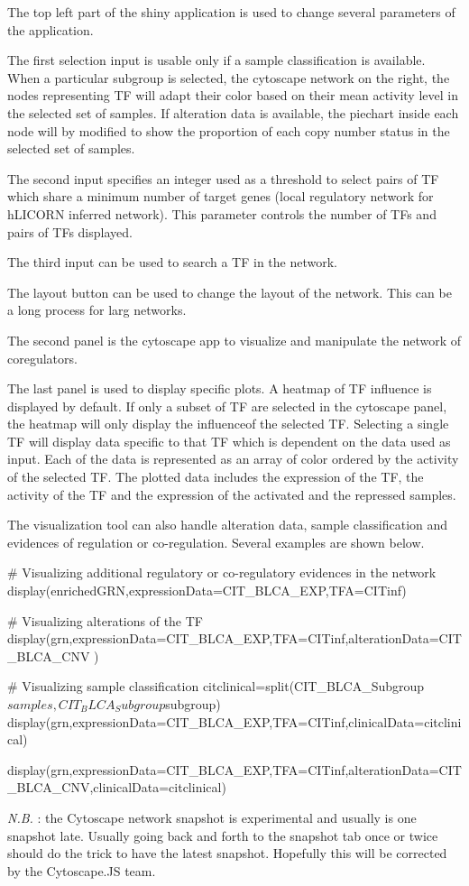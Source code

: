 \documentclass[12pt]{article}
\begin{document}
The top left part of the shiny application is used to change several
parameters of the application.


The first selection input is usable only if a sample classification is
available. When a particular subgroup is selected, the cytoscape network
on the right, the nodes representing TF will adapt their color based on
their mean activity level in the selected set of samples. If alteration
data is available, the piechart inside each node will by modified to
show the proportion of each copy number status in the selected set of
samples.

The second input specifies an integer used as a threshold to select
pairs of TF which share a minimum number of target genes (local
regulatory network for hLICORN inferred network). This parameter
controls the number of TFs and pairs of TFs displayed.

The third input can be used to search a TF in the network.

The layout button can be used to change the layout of the network. This
can be a long process for larg networks.

The second panel is the cytoscape app to visualize and manipulate the
network of coregulators.

The last panel is used to display specific plots. A heatmap of TF
influence is displayed by default. If only a subset of TF are selected
in the cytoscape panel, the heatmap will only display the influenceof
the selected TF. Selecting a single TF will display data specific to
that TF which is dependent on the data used as input. Each of the data
is represented as an array of color ordered by the activity of the
selected TF. The plotted data includes the expression of the TF, the
activity of the TF and the expression of the activated and the repressed
samples.

The visualization tool can also handle alteration data, sample
classification and evidences of regulation or co-regulation. Several
examples are shown below.

 \begin{Schunk}
\begin{Sinput}
    # Visualizing additional regulatory or co-regulatory evidences in the network
    display(enrichedGRN,expressionData=CIT_BLCA_EXP,TFA=CITinf)

    # Visualizing alterations of the TF
    display(grn,expressionData=CIT_BLCA_EXP,TFA=CITinf,alterationData=CIT_BLCA_CNV )

    # Visualizing sample classification
    citclinical=split(CIT_BLCA_Subgroup$samples,CIT_BLCA_Subgroup$subgroup)
    display(grn,expressionData=CIT_BLCA_EXP,TFA=CITinf,clinicalData=citclinical)


    display(grn,expressionData=CIT_BLCA_EXP,TFA=CITinf,alterationData=CIT_BLCA_CNV,clinicalData=citclinical)
\end{Sinput}
\end{Schunk}

\textit{N.B.} : the Cytoscape network snapshot is experimental and usually is
one snapshot late. Usually going back and forth to the snapshot tab once
or twice should do the trick to have the latest snapshot. Hopefully this
will be corrected by the Cytoscape.JS team.
\end{document}
